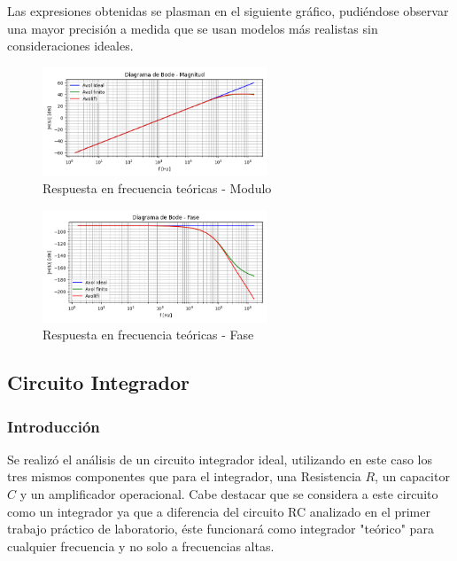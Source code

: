 Las expresiones obtenidas se plasman en el siguiente gráfico, pudiéndose 
observar una mayor precisión a medida que se usan modelos más realistas
sin consideraciones ideales.
\begin{figure}[H]
    \centering
    \includegraphics[width=0.6\textwidth]{../Ejercicio3-CircuitoIntegradoresyDerivadores/Imagenes/Derivador/bode_derivador magnitud.png}
    \caption{Respuesta en frecuencia teóricas - Modulo}
\end{figure}
\begin{figure}[H]
    \centering
    \includegraphics[width=0.6\textwidth]{../Ejercicio3-CircuitoIntegradoresyDerivadores/Imagenes/Derivador/bode_derivador_fase.png}
    \caption{Respuesta en frecuencia teóricas - Fase}
\end{figure}












\subsection{Circuito Integrador}

\subsubsection{Introducción}

Se realizó el análisis de un circuito integrador ideal, utilizando en este caso los tres mismos componentes que para el integrador, una Resistencia $R$,
un capacitor $C$ y un amplificador operacional. 
Cabe destacar que se considera  a este circuito como un integrador ya que a diferencia del circuito RC analizado en el primer trabajo práctico de laboratorio,
éste funcionará como integrador "teórico" para cualquier frecuencia y no solo a frecuencias altas. 

